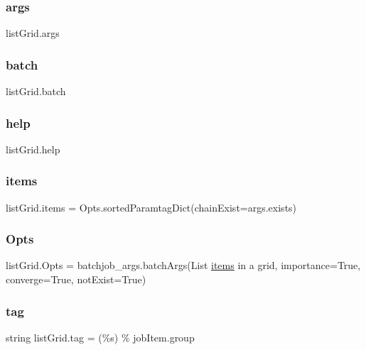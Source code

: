 \subsubsection{\texorpdfstring{args}{args}}
{\footnotesize\ttfamily list\+Grid.\+args}

\mbox{\label{namespacelistGrid_a1a97033b20d3a555487a2db14d9c3d2b}} 
\subsubsection{\texorpdfstring{batch}{batch}}
{\footnotesize\ttfamily list\+Grid.\+batch}

\mbox{\label{namespacelistGrid_ad219e78d46c196476b5a977aed4bd0a6}} 
\subsubsection{\texorpdfstring{help}{help}}
{\footnotesize\ttfamily list\+Grid.\+help}

\mbox{\label{namespacelistGrid_a26521e1c761d77bbc23ee4ecc98b92ff}} 
\subsubsection{\texorpdfstring{items}{items}}
{\footnotesize\ttfamily list\+Grid.\+items = Opts.\+sorted\+Paramtag\+Dict(chain\+Exist=args.\+exists)}

\mbox{\label{namespacelistGrid_a2f4dfd6918f45257401e3b5d4dbb557e}} 
\subsubsection{\texorpdfstring{Opts}{Opts}}
{\footnotesize\ttfamily list\+Grid.\+Opts = batchjob\+\_\+args.\+batch\+Args(\textquotesingle{}List \mbox{\hyperlink{namespacelistGrid_a26521e1c761d77bbc23ee4ecc98b92ff}{items}} in a grid\textquotesingle{}, importance=True, converge=True, not\+Exist=True)}

\mbox{\label{namespacelistGrid_a93127bd8469d19ea1502dcfdf9597eef}} 
\subsubsection{\texorpdfstring{tag}{tag}}
{\footnotesize\ttfamily string list\+Grid.\+tag = \textquotesingle{}(\%s)\textquotesingle{} \% job\+Item.\+group}

